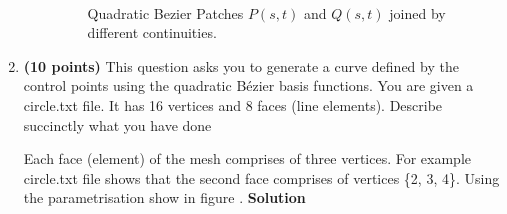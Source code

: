 \documentclass[a4paper, 11pt]{article}
\begin{document}
\begin{enumerate}
\begin{enumerate}[label=\alph*.]
\begin{figure}[ht]
{  } \\
  \quad 
  \caption{Quadratic Bezier Patches \(P(s,t)\) and \(Q(s,t)\) joined by different continuities.} 
  \label{fig:bezierSurfacesJoined}
\end{figure}
\clearpage
\end{enumerate}

\item \textbf{(10 points)} This question asks you to generate a curve defined by the control points using the quadratic B\'{e}zier basis functions. You are given a circle.txt file. It has 16 vertices and 8 faces (line elements). Describe succinctly what you have done

Each face (element) of the mesh comprises of three vertices. For example circle.txt file shows that the second face comprises of vertices \{2, 3, 4\}. Using the parametrisation show in figure .
\textbf{Solution}


\end{enumerate}
\end{document}
